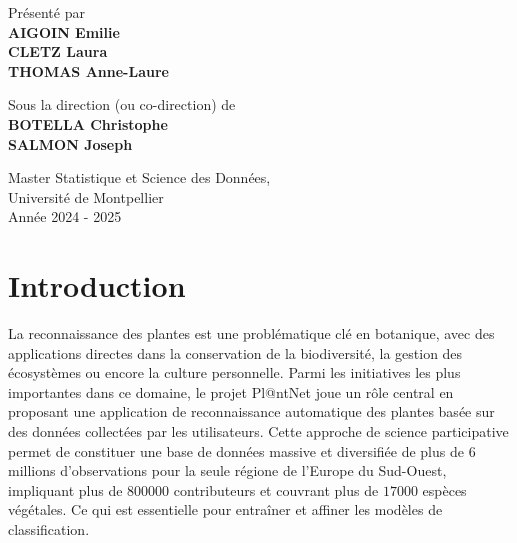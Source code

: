 \documentclass[a4paper,12pt]{article}
\begin{document}
\vfill
\begin{center}
Présenté par \\ \vspace{0.2cm}
    {\textbf{AIGOIN Emilie \\ \vspace{0.1cm} CLETZ Laura \\ \vspace{0.1cm} THOMAS Anne-Laure}}\\ \vspace{0.6cm}
    
Sous la direction (ou co-direction) de \\ \vspace{0.2cm}
    {\textbf{BOTELLA Christophe \\ \vspace{0.1cm} SALMON Joseph }}\\ \vspace{1.5cm}
    
    {\large Master Statistique et Science des Données, \\ \vspace{0.1cm} Université de Montpellier}\\ \vspace{0.6cm}
    {\large Année 2024 - 2025}
\end{center}

\thispagestyle{empty}

\newpage

\tableofcontents 

\newpage


\section{Introduction}

La reconnaissance des plantes est une problématique clé en botanique, avec des applications directes dans la conservation de la biodiversité, la gestion des écosystèmes ou encore la culture personnelle. Parmi les initiatives les plus importantes dans ce domaine, le projet Pl@ntNet joue un rôle central en proposant une application de reconnaissance automatique des plantes basée sur des données collectées par les utilisateurs. Cette approche de science participative permet de constituer une base de données massive et diversifiée de plus de $6$ millions d'observations pour la seule régione de l'Europe du Sud-Ouest, impliquant plus de $800000$ contributeurs et couvrant plus de $17000$ espèces végétales. Ce qui est essentielle pour entraîner et affiner les modèles de classification.
\end{document}
